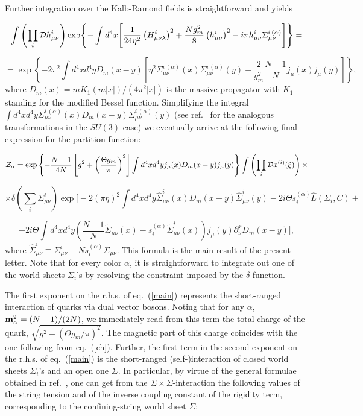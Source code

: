 \documentclass[a4paper,12pt]{article}
\begin{document}
Further integration over the Kalb-Ramond fields is straightforward and yields

$$\int\left(\prod\limits_{i}^{}{\cal D}h_{\mu\nu}^i\right)
\exp\Biggl\{-\int d^4x\Biggl[\frac{1}{24\eta^2}
\left(H_{\mu\nu\lambda}^i\right)^2+\frac{Ng_m^2}{8}\left(h_{\mu\nu}^i\right)^2
-i\pi h_{\mu\nu}^i\Sigma_{\mu\nu}^{i{\,}(\alpha)}\Biggr]\Biggr\}=$$

$$
=\exp\left\{-2\pi^2\int d^4xd^4yD_m(x-y)\left[\eta^2\Sigma_{\mu\nu}^{i{\,}(\alpha)}(x)\Sigma_{\mu\nu}^{i{\,}(\alpha)}(y)
+\frac{2}{g_m^2}\frac{N-1}{N}j_\mu(x)j_\mu(y)\right]\right\},$$
where $D_m(x)=mK_1(m|x|)/(4\pi^2|x|)$ is the massive propagator with $K_1$ standing
for the modified Bessel function. Simplifying the integral
$\int d^4xd^4y\Sigma_{\mu\nu}^{i{\,}(\alpha)}(x)D_m(x-y)\Sigma_{\mu\nu}^{i{\,}(\alpha)}(y)$ (see ref.~\cite{theta}
for the analogous transformations in the $SU(3)$-case) we eventually arrive at the following final expression for the partition function:



$$
{\cal Z}_\alpha=
\exp\left\{-\frac{N-1}{4N}\left[g^2+\left(\frac{\Theta g_m}{\pi}\right)^2\right]
\int d^4x d^4y j_\mu(x)D_m(x-y)j_\mu(y)\right\}
\int\left(\prod\limits_{i}^{}{\cal D}x^{(i)}(\xi)\right)
\times$$

$$
\times\delta\left(\sum\limits_{i}^{}\Sigma_{\mu\nu}^i\right)
\exp\Biggl[
-2(\pi\eta)^2\int d^4x d^4y\hat\Sigma_{\mu\nu}^i(x)
D_m(x-y)\hat\Sigma_{\mu\nu}^i(y)-2i\Theta s_i^{(\alpha)}\hat L\left(\Sigma_i,C\right)+
$$


\begin{equation}
\label{main}
+2i\Theta\int d^4xd^4y\left(\frac{N-1}{N}\tilde\Sigma_{\mu\nu}(x)-s_i^{(\alpha)}\tilde\Sigma_{\mu\nu}^i(x)\right)j_\mu(y)
\partial_\nu^xD_m(x-y)\Biggr],
\end{equation}
where $\hat\Sigma_{\mu\nu}^i\equiv\Sigma_{\mu\nu}^i-Ns_i^{(\alpha)}\Sigma_{\mu\nu}$.
This formula is the main result of the present letter.
Note that
for every color $\alpha$, it is straightforward to
integrate out one of
the world sheets $\Sigma_i$'s by resolving the constraint
imposed by the $\delta$-function.



The first exponent
on the r.h.s. of eq.~(\ref{main}) represents the short-ranged interaction
of quarks via dual vector bosons. Noting that for any $\alpha$,
${\bf m}_\alpha^2=(N-1)/(2N)$, we immediately read from this term the total charge of the
quark, $\sqrt{g^2+(\Theta g_m/\pi)^2}$. The magnetic part of this charge coincides
with the one following from eq.~(\ref{ch}).
Further, the first term in the
second exponent on the r.h.s. of eq.~(\ref{main}) is the
short-ranged (self-)interaction of
closed world sheets $\Sigma_i$'s and an open one $\Sigma$.
In particular, by virtue of the general formulae obtained in ref.~\cite{mpla}, one can get from
the $\Sigma\times\Sigma$-interaction
the following values of the string tension and of the
inverse coupling constant of the rigidity term, corresponding to the confining-string world sheet $\Sigma$:
\end{document}

